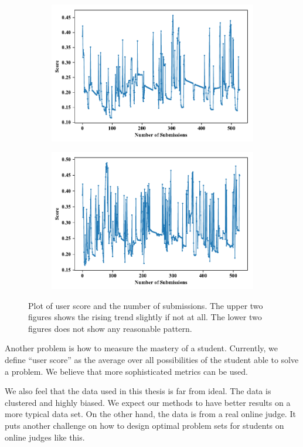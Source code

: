 \begin{figure}
\begin{subfigure}[b]{0.475\textwidth}
            \includegraphics[width=\textwidth]{img/submit-score-user-1013.pdf}
        \end{subfigure}
        \hfill
        \begin{subfigure}[b]{0.475\textwidth}
            \centering
            \includegraphics[width=\textwidth]{img/submit-score-user-2799.pdf}
        \end{subfigure}
        \caption[Plot of user score and the number of submissions]{
            Plot of user score and the number of submissions.
            The upper two figures shows the rising trend slightly if not at all.
            The lower two figures does not show any reasonable pattern.
        }
        \label{fig:user model interpretability}
    \end{figure}

    Another problem is how to measure the mastery of a student.
    Currently, we define ``user score'' as the average over all possibilities of the student able to solve a problem.
    We believe that more sophisticated metrics can be used.

    We also feel that the data used in this thesis is far from ideal.
    The data is clustered and highly biased.
    We expect our methods to have better results on a more typical data set.
    On the other hand, the data is from a real online judge.
    It puts another challenge on how to design optimal problem sets for students on online judges like this.





